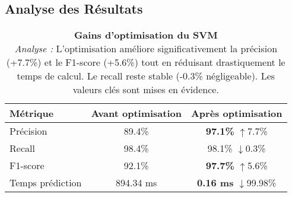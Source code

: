 \documentclass[a4paper, 12pt]{article}
\begin{document}
\subsection{Analyse des Résultats}
\begin{table}[H]
\centering
\begin{tabular}{@{}lcc@{}}
\toprule
\textbf{Métrique} & \textbf{Avant optimisation} & \textbf{Après optimisation} \\
\midrule
Précision & 89.4\% & \textbf{97.1\%} $\uparrow$7.7\% \\
Recall & 98.4\% & 98.1\% $\downarrow$0.3\% \\
F1-score & 92.1\% & \textbf{97.7\%} $\uparrow$5.6\% \\
Temps prédiction & 894.34 ms & \textbf{0.16 ms} $\downarrow$99.98\% \\
\bottomrule
\end{tabular}
\caption{\textbf{Gains d'optimisation du SVM} \\
\textit{Analyse :} L'optimisation améliore significativement la précision (+7.7\%) et le F1-score (+5.6\%) tout en réduisant drastiquement le temps de calcul. Le recall reste stable (-0.3\% négligeable). Les valeurs clés sont mises en évidence.}
\label{tab:svm_results}
\end{table}
\end{document}
